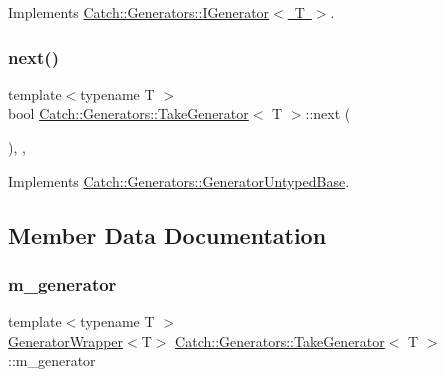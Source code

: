 Implements \mbox{\hyperlink{struct_catch_1_1_generators_1_1_i_generator_a525d381fc9249a885b075a0632a8579a}{Catch\+::\+Generators\+::\+I\+Generator$<$ T $>$}}.

\mbox{\label{class_catch_1_1_generators_1_1_take_generator_ae343f3e28fe04e0a20d6fdf69bfb4c78}} 
\subsubsection{\texorpdfstring{next()}{next()}}
{\footnotesize\ttfamily template$<$typename T $>$ \\
bool \mbox{\hyperlink{class_catch_1_1_generators_1_1_take_generator}{Catch\+::\+Generators\+::\+Take\+Generator}}$<$ T $>$\+::next (\begin{DoxyParamCaption}{ }\end{DoxyParamCaption})\hspace{0.3cm}{\ttfamily [inline]}, {\ttfamily [override]}, {\ttfamily [virtual]}}



Implements \mbox{\hyperlink{class_catch_1_1_generators_1_1_generator_untyped_base_aeed3c0cd6233c5f553549e453b8d6638}{Catch\+::\+Generators\+::\+Generator\+Untyped\+Base}}.



\subsection{Member Data Documentation}
\mbox{\label{class_catch_1_1_generators_1_1_take_generator_a2193ff62cd0fe809049b6d6b2f399d89}} 
\subsubsection{\texorpdfstring{m\_generator}{m\_generator}}
{\footnotesize\ttfamily template$<$typename T $>$ \\
\mbox{\hyperlink{class_catch_1_1_generators_1_1_generator_wrapper}{Generator\+Wrapper}}$<$T$>$ \mbox{\hyperlink{class_catch_1_1_generators_1_1_take_generator}{Catch\+::\+Generators\+::\+Take\+Generator}}$<$ T $>$\+::m\+\_\+generator\hspace{0.3cm}{\ttfamily [private]}}

